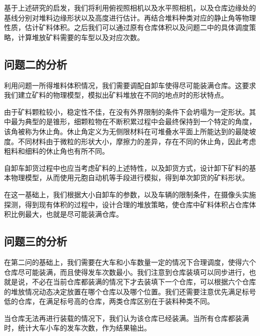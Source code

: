 \documentclass{my_paper}
\begin{document}
基于上述研究的启发，我们将利用俯视照相机以及水平照相机，以及仓库边缘处的基线分别对堆料边缘形状以及高度进行估计。再结合堆料种类对应的静止角等物理性质，估计矿料体积。之后我们可以通过原有仓库体积以及问题二中的具体调度策略，计算堆放矿料需要的车型以及对应次数。

\subsection{问题二的分析}
利用问题一所得堆料体积情况，我们需要调配自卸车使得尽可能装满仓库。这要求我们建立矿料的物理模型，模拟出矿料堆放在不同的地点时的形状特点。

由于矿料颗粒较小，稳定性不佳，在没有外界限制的条件下会坍塌为一定形状。其中最为典型的是锥形，细颗粒物在不断积累过程中会最终保持到一个特定的角度，该角被称为休止角。休止角定义为无侧限材料在可堆叠水平面上所能达到的最陡坡度。\cite{angle}不同材料由于微粒的形状大小，摩擦力的差异，存在不同的休止角，因此考虑粗料和细料的休止角也有所不同。

自卸车卸货过程中也应当考虑矿料的上述特性，以及卸货方式，设计卸下矿料的基本物理模型，从而使用元胞自动机等手段进行模拟，得到单次卸货的矿料形状。

在这一基础上，我们根据大小自卸车的参数，以及车辆的限制条件，在摄像头实施探测，得到现有体积的过程中，设计合理的堆放策略，使仓库中矿料体积占仓库体积比例最大，也就是尽可能装满仓库。

\subsection{问题三的分析}

在第二问的基础上，我们需要在大车和小车数量一定的情况下合理调度，使得六个仓库尽可能装满，而且使得发车次数最小。我们注意到仓库装填可以同步进行，也就是说，不必在当前仓库都装满的情况下才去装填下一个仓库，可以根据六个仓库的堆放情况动态决定放置在哪个仓库以及哪个位置。我们还需要注意优先满足标号低的仓库，在满足标号高的仓库，两类仓库区别在于装料种类不同。

当仓库无法再进行装载的情况下，我们认为该仓库已经装满。当所有仓库都装满时，统计大车小车的发车次数，作为结果输出。

\end{document}
